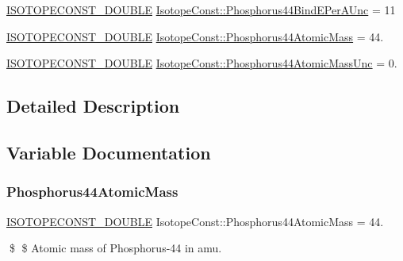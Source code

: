 \begin{DoxyCompactItemize}
\mbox{\hyperlink{group___isotope_const-_macros_ga8f45a7272ce02c0b4c65c44636ed719a}{I\+S\+O\+T\+O\+P\+E\+C\+O\+N\+S\+T\+\_\+\+D\+O\+U\+B\+LE}} \mbox{\hyperlink{group___isotope_const-_phosphorus-_p44_ga043e942236f28695e3198418fd73cbc2}{Isotope\+Const\+::\+Phosphorus44\+Bind\+E\+Per\+A\+Unc}} = 11
\item 
\mbox{\hyperlink{group___isotope_const-_macros_ga8f45a7272ce02c0b4c65c44636ed719a}{I\+S\+O\+T\+O\+P\+E\+C\+O\+N\+S\+T\+\_\+\+D\+O\+U\+B\+LE}} \mbox{\hyperlink{group___isotope_const-_phosphorus-_p44_gad7a178463361e3d2fc199ec576335e79}{Isotope\+Const\+::\+Phosphorus44\+Atomic\+Mass}} = 44.
\item 
\mbox{\hyperlink{group___isotope_const-_macros_ga8f45a7272ce02c0b4c65c44636ed719a}{I\+S\+O\+T\+O\+P\+E\+C\+O\+N\+S\+T\+\_\+\+D\+O\+U\+B\+LE}} \mbox{\hyperlink{group___isotope_const-_phosphorus-_p44_ga783014495cc5b97e473eb19cda5e751e}{Isotope\+Const\+::\+Phosphorus44\+Atomic\+Mass\+Unc}} = 0.
\end{DoxyCompactItemize}


\subsection{Detailed Description}


\subsection{Variable Documentation}
\mbox{\label{group___isotope_const-_phosphorus-_p44_gad7a178463361e3d2fc199ec576335e79}} 
\subsubsection{\texorpdfstring{Phosphorus44\+Atomic\+Mass}{Phosphorus44AtomicMass}}
{\footnotesize\ttfamily \mbox{\hyperlink{group___isotope_const-_macros_ga8f45a7272ce02c0b4c65c44636ed719a}{I\+S\+O\+T\+O\+P\+E\+C\+O\+N\+S\+T\+\_\+\+D\+O\+U\+B\+LE}} Isotope\+Const\+::\+Phosphorus44\+Atomic\+Mass = 44.}

\$ \$ Atomic mass of Phosphorus-\/44 in amu. \mbox{\label{group___isotope_const-_phosphorus-_p44_ga783014495cc5b97e473eb19cda5e751e}} 

